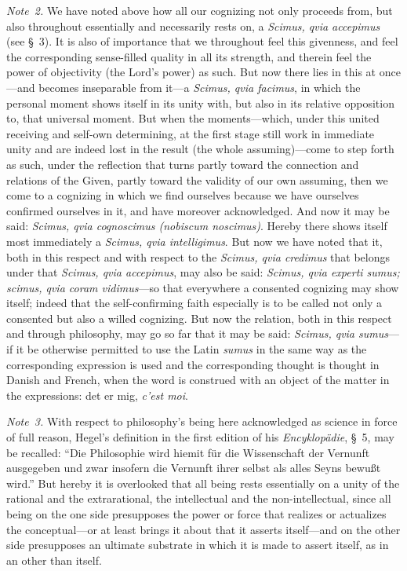 \documentclass[12pt,a4paper]{book}
\begin{document}
{\small\emph{Note~2.} We have noted above how all our cognizing not only proceeds
from, but also throughout essentially and necessarily rests on, a \textit{Scimus,
qvia accepimus} (see \S~3). It is also of importance that we throughout feel this
givenness, and feel the corresponding sense-filled quality in all its strength, and
therein feel the power of objectivity (the Lord's power) as such. But now there
lies in this at once---and becomes inseparable from it---a \textit{Scimus, qvia
facimus}, in which the personal moment shows itself in its unity with, but also in
its relative opposition to, that universal moment. But when the moments---which,
under this united receiving and self-own determining, at the first stage still work
in immediate unity and are indeed lost in the result (the whole assuming)---come to
step forth as such, under the reflection that turns partly toward the connection and
relations of the Given, partly toward the validity of our own assuming, then we come
to a cognizing in which we find ourselves because we have ourselves confirmed
ourselves in it, and have moreover acknowledged. And now it may be said:
\textit{Scimus, qvia cognoscimus (nobiscum noscimus)}. Hereby there shows itself
most immediately a \textit{Scimus, qvia intelligimus}. But now we have noted that
it, both in this respect and with respect to the \textit{Scimus, qvia credimus} that
belongs under that \textit{Scimus, qvia accepimus}, may also be said: \textit{Scimus,
qvia experti sumus; scimus, qvia coram vidimus}---so that everywhere a consented
cognizing may show itself; indeed that the self-confirming faith especially is to be
called not only a consented but also a willed cognizing. But now the relation, both
in this respect and through philosophy, may go so far that it may be said:
\textit{Scimus, qvia sumus}---if it be otherwise permitted to use the Latin
\textit{sumus} in the same way as the corresponding expression is used and the
corresponding thought is thought in Danish and French, when the word is construed
with an object of the matter in the expressions: det er mig, \textit{c'est
moi}.\par}

{\small\emph{Note~3.} With respect to philosophy's being here acknowledged as
science in force of full reason, Hegel's definition in the first edition of his
\textit{Encyklopädie}, \S~5, may be recalled: ``Die Philosophie wird hiemit für die
Wissenschaft der Vernunft ausgegeben und zwar insofern die Vernunft ihrer selbst als
alles Seyns bewußt wird.'' But hereby it is overlooked that all being rests
essentially on a unity of the rational and the extrarational, the intellectual and
the non-intellectual, since all being on the one side presupposes the power or force
that realizes or actualizes the conceptual---or at least brings it about that it
asserts itself---and on the other side presupposes an ultimate substrate in which it
is made to assert itself, as in an other than itself.\par}
\end{document}
